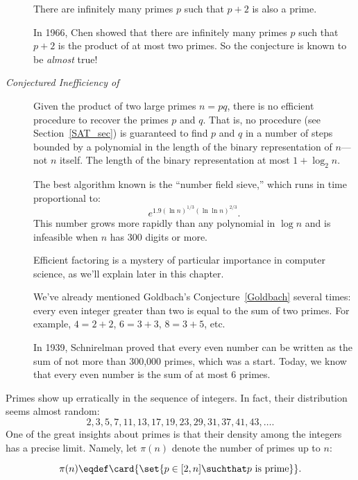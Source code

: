 \begin{description}

\item[] There are infinitely many primes
  $p$ such that $p + 2$ is also a prime.

  In 1966, Chen showed that there are infinitely many primes $p$ such
  that $p + 2$ is the product of at most two primes.  So the
  conjecture is known to be \emph{almost} true!

\item[\emph{Conjectured Inefficiency of }] Given the
  product of two large primes $n = pq$, there is no efficient
  procedure to recover the primes $p$ and $q$.  That is, no
  \emph{} procedure (see Section~\ref{SAT_sec})
  is guaranteed to find $p$ and $q$ in a number of steps bounded by a
  polynomial in the length of the binary representation of $n$---not
  $n$ itself.  The length of the binary representation at most
  $1+\log_2 n$.

  The best algorithm known is the ``number field sieve,'' which runs
  in time proportional to:
  \[
  e^{1.9(\ln n)^{1/3} (\ln\ln n)^{2/3}}.
  \]
  This number grows more rapidly than any polynomial in $\log n$ and
  is infeasible when $n$ has 300 digits or more.

  Efficient factoring is a mystery of particular importance in
  computer science, as we'll explain later in this chapter.

\item[] We've already mentioned Goldbach's
  Conjecture~\ref{Goldbach} several times: every even integer greater
  than two is equal to the sum of two primes.  For example, $4 = 2 +
  2$, $6 = 3 + 3$, $8 = 3 + 5$, etc.

  In 1939, Schnirelman proved that every even number can be written as
  the sum of not more than 300,000 primes, which was a start.  Today,
  we know that every even number is the sum of at most 6 primes.
\end{description}

Primes show up erratically in the sequence of integers.  In fact,
their distribution seems almost random:
\[
2, 3, 5, 7, 11, 13, 17, 19, 23, 29, 31, 37, 41, 43, \dots.
\]
One of the great insights about primes is that their density among the
integers has a precise limit.  Namely, let $\pi(n)$ denote the number
of primes up to $n$:

\begin{definition}\label{def:prime<x}
\[
  \pi(n) \eqdef \card{\set{p \in [2, n] \suchthat p \text{ is
        prime}}}.
\]
\end{definition}

